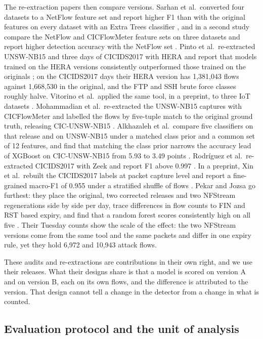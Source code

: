 \documentclass[pdflatex,sn-mathphys-num]{sn-jnl}
\newcommand{\litnum}[1]{#1}
\newcommand{\cicids}{CICIDS2017}
\theoremstyle{thmstyleone}%
\theoremstyle{thmstylethree}%
\begin{document}
The re-extraction papers then compare versions. Sarhan et al.\ converted four datasets to a NetFlow feature set and report higher F1 than with the original features on every dataset with an Extra Trees classifier \cite{sarhan2022}, and in a second study compare the NetFlow and CICFlowMeter feature sets on three datasets and report higher detection accuracy with the NetFlow set \cite{sarhan2022bdr}. Pinto et al.\ re-extracted UNSW-NB15 and three days of \cicids{} with HERA and report that models trained on the HERA versions consistently outperformed those trained on the originals \cite{pinto2025}; on the \cicids{} days their HERA version has \litnum{1{,}381{,}043} flows against \litnum{1{,}668{,}530} in the original, and the FTP and SSH brute force classes roughly halve. Vitorino et al.\ applied the same tool, in a preprint, to three IoT datasets \cite{vitorino2025}. Mohammadian et al.\ re-extracted the UNSW-NB15 captures with CICFlowMeter and labelled the flows by five-tuple match to the original ground truth, releasing CIC-UNSW-NB15 \cite{mohammadian2024}. Alkhazaleh et al.\ compare five classifiers on that release and on UNSW-NB15 under a matched class prior and a common set of \litnum{12} features, and find that matching the class prior narrows the accuracy lead of XGBoost on CIC-UNSW-NB15 from \litnum{5.93} to \litnum{3.49} points \cite{alkhazaleh2026}. Rodr\'iguez et al.\ re-extracted \cicids{} with Zeek and report F1 above \litnum{0.997} \cite{rodriguez2022}. In a preprint, Xin et al.\ rebuilt the \cicids{} labels at packet capture level and report a fine-grained macro-F1 of \litnum{0.955} under a stratified shuffle of flows \cite{xin2026}. Pekar and Jozsa go furthest: they place the original, two corrected releases and two NFStream regenerations side by side per day, trace differences in flow counts to FIN and RST based expiry, and find that a random forest scores consistently high on all five \cite{pekar2024}. Their Tuesday counts show the scale of the effect: the two NFStream versions come from the same tool and the same packets and differ in one expiry rule, yet they hold \litnum{6{,}972} and \litnum{10{,}943} attack flows.

These audits and re-extractions are contributions in their own right, and we use their releases. What their designs share is that a model is scored on version A and on version B, each on its own flows, and the difference is attributed to the version. That design cannot tell a change in the detector from a change in what is counted.

\subsection{Evaluation protocol and the unit of analysis}
\end{document}
